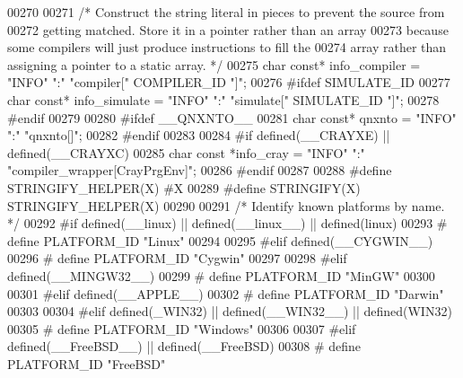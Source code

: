 \begin{DoxyCode}
{{{{{{{{{{{{{{{{{{{{{{{{{{{{{{{{{{{{00270 
00271 \textcolor{comment}{/* Construct the string literal in pieces to prevent the source from}
00272 \textcolor{comment}{   getting matched.  Store it in a pointer rather than an array}
00273 \textcolor{comment}{   because some compilers will just produce instructions to fill the}
00274 \textcolor{comment}{   array rather than assigning a pointer to a static array.  */}
00275 \textcolor{keywordtype}{char} \textcolor{keyword}{const}* info_compiler = \textcolor{stringliteral}{"INFO"} \textcolor{stringliteral}{":"} \textcolor{stringliteral}{"compiler["} COMPILER_ID \textcolor{stringliteral}{"]"};
00276 \textcolor{preprocessor}{#ifdef SIMULATE\_ID}
00277 \textcolor{keywordtype}{char} \textcolor{keyword}{const}* info\_simulate = \textcolor{stringliteral}{"INFO"} \textcolor{stringliteral}{":"} \textcolor{stringliteral}{"simulate["} SIMULATE\_ID \textcolor{stringliteral}{"]"};
00278 \textcolor{preprocessor}{#endif}
00279 
00280 \textcolor{preprocessor}{#ifdef \_\_QNXNTO\_\_}
00281 \textcolor{keywordtype}{char} \textcolor{keyword}{const}* qnxnto = \textcolor{stringliteral}{"INFO"} \textcolor{stringliteral}{":"} \textcolor{stringliteral}{"qnxnto[]"};
00282 \textcolor{preprocessor}{#endif}
00283 
00284 \textcolor{preprocessor}{#if defined(\_\_CRAYXE) || defined(\_\_CRAYXC)}
00285 \textcolor{keywordtype}{char} \textcolor{keyword}{const} *info\_cray = \textcolor{stringliteral}{"INFO"} \textcolor{stringliteral}{":"} \textcolor{stringliteral}{"compiler\_wrapper[CrayPrgEnv]"};
00286 \textcolor{preprocessor}{#endif}
00287 
00288 \textcolor{preprocessor}{#define STRINGIFY\_HELPER(X) #X}
00289 \textcolor{preprocessor}{#define STRINGIFY(X) STRINGIFY\_HELPER(X)}
00290 
00291 \textcolor{comment}{/* Identify known platforms by name.  */}
00292 \textcolor{preprocessor}{#if defined(\_\_linux) || defined(\_\_linux\_\_) || defined(linux)}
00293 \textcolor{preprocessor}{# define PLATFORM\_ID "Linux"}
00294 
00295 \textcolor{preprocessor}{#elif defined(\_\_CYGWIN\_\_)}
00296 \textcolor{preprocessor}{# define PLATFORM\_ID "Cygwin"}
00297 
00298 \textcolor{preprocessor}{#elif defined(\_\_MINGW32\_\_)}
00299 \textcolor{preprocessor}{# define PLATFORM\_ID "MinGW"}
00300 
00301 \textcolor{preprocessor}{#elif defined(\_\_APPLE\_\_)}
00302 \textcolor{preprocessor}{# define PLATFORM\_ID "Darwin"}
00303 
00304 \textcolor{preprocessor}{#elif defined(\_WIN32) || defined(\_\_WIN32\_\_) || defined(WIN32)}
00305 \textcolor{preprocessor}{# define PLATFORM\_ID "Windows"}
00306 
00307 \textcolor{preprocessor}{#elif defined(\_\_FreeBSD\_\_) || defined(\_\_FreeBSD)}
00308 \textcolor{preprocessor}{# define PLATFORM\_ID "FreeBSD"}
}}}}}}}}}}}}}}}}}}}}}}}}}}}}}}}}}}}}
\end{DoxyCode}
